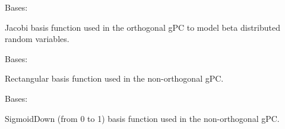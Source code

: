 \documentclass[letterpaper,10pt,english,openany,oneside]{sphinxmanual}
\begin{document}

\begin{fulllineitems}
\label{\detokenize{pygpc:pygpc.BasisFunction.Jacobi}}
Bases: {\hyperref[\detokenize{pygpc:pygpc.BasisFunction.BasisFunction}]{}}

Jacobi basis function used in the orthogonal gPC to model beta distributed random variables.

\end{fulllineitems}


\begin{fulllineitems}
\label{\detokenize{pygpc:pygpc.BasisFunction.Rect}}
Bases: {\hyperref[\detokenize{pygpc:pygpc.BasisFunction.BasisFunction}]{}}

Rectangular basis function used in the non-orthogonal gPC.

\end{fulllineitems}


\begin{fulllineitems}
\label{\detokenize{pygpc:pygpc.BasisFunction.SigmoidDown}}
Bases: {\hyperref[\detokenize{pygpc:pygpc.BasisFunction.BasisFunction}]{}}

SigmoidDown (from 0 to 1) basis function used in the non-orthogonal gPC.

\end{fulllineitems}

\end{document}
